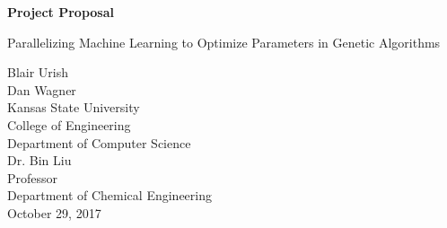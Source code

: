 \documentclass[letterpaper, 12pt]{article}
\begin{document}
\begin{titlepage}
\centering
	\vspace*{5.75cm}
	{\huge\bfseries Project Proposal\par}
	{\large Parallelizing Machine Learning to Optimize Parameters in Genetic Algorithms\par}
	\vspace{2cm}
	Blair Urish\\
	Dan Wagner\\
	Kansas State University\\
	College of Engineering\\
	Department of Computer Science\\
	\vspace{1cm}
	Dr. Bin Liu\\
	Professor\\
	Department of Chemical Engineering\\
	\vspace{1cm}
	October 29, 2017
\end{titlepage}

\begin{abstract}
\thispagestyle{plain}
\begin{flushleft}
	It is difficult for traditional materials to have some desirable traits that often conflict with one another.  Hybrid materials are crafted to solve this, but the compounds are difficult to identify.  Using machine learning and genetic algorithms to locate the traits of these compounds has had success but is inefficient in computing power.  Thus, we propose an approach to parallelize the process by distributing the work across several nodes in a master-slave relationship.  This method will allow the computation time to be spread across chunks of data, and result in an overall lower run time.
\end{flushleft}
\end{abstract}
\newpage
\end{document}
